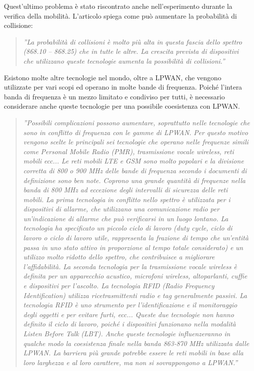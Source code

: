 \documentclass[a4paper]{report} %
\begin{document}
Quest'ultimo problema è stato riscontrato anche nell'esperimento \cite{art:rif.47} durante la verifica della mobilità. L'articolo \cite{art:rif.46} spiega come può aumentare la probabilità di collisione:
\begin{quote}
	\textit{''La probabilità di collisioni è molto più alta in questa fascia dello spettro (868.10 – 868.25) che in tutte le altre. La crescita prevista di dispositivi che utilizzano queste tecnologie aumenta la possibilità di collisioni.''}
\end{quote}
Esistono molte altre tecnologie nel mondo, oltre a LPWAN, che vengono utilizzate per vari scopi ed operano in molte bande di frequenza. Poiché l'intera banda di frequenza è un mezzo limitato e condiviso per tutti, è necessario considerare anche queste tecnologie per una possibile coesistenza con LPWAN. 
\begin{quote}
	\textit{''Possibili complicazioni possono aumentare, soprattutto nelle tecnologie che sono in conflitto di frequenza con le gamme di LPWAN. Per questo motivo vengono scelte le principali sei tecnologie che operano nelle frequenze simili come Personal Mobile Radio (PMR), trasmissione vocale wireless, reti mobili ecc... Le reti mobili LTE e GSM sono molto popolari e la divisione corretta di 800 o 900 MHz delle bande di frequenza secondo i documenti di definizione sono ben note. Coprono una grande quantità di frequenze nella banda di 800 MHz ad eccezione degli intervalli di sicurezza delle reti mobili.
	La prima tecnologia in conflitto nello spettro è utilizzata per i dispositivi di allarme, che utilizzano una comunicazione radio per un'indicazione di allarme che può verificarsi in un luogo lontano. La tecnologia ha specificato un piccolo ciclo di lavoro (duty cycle, ciclo di lavoro o ciclo di lavoro utile, rappresenta la frazione di tempo che un'entità passa in uno stato attivo in proporzione al tempo totale considerato) e un utilizzo molto ridotto dello spettro, che contribuisce a migliorare l'affidabilità. La seconda tecnologia per la trasmissione vocale wireless è definita per un apparecchio acustico, microfoni wireless, altoparlanti, cuffie e dispositivi per l'ascolto. La tecnologia RFID (Radio Frequency Identification) utilizza ricetrasmittenti radio e tag generalmente passivi. La tecnologia RFID è uno strumento per l'identificazione e il monitoraggio degli oggetti e per evitare furti, ecc... Queste due tecnologie non hanno definito il ciclo di lavoro, poiché i dispositivi funzionano nella modalità Listen Before Talk (LBT). Anche queste tecnologie influenzeranno in qualche modo la coesistenza finale nella banda 863-870 MHz utilizzata dalle LPWAN. La barriera più grande potrebbe essere le reti mobili in base alla loro larghezza e al loro carattere, ma non si sovrappongono a LPWAN.''}
\end{quote}
\end{document}
